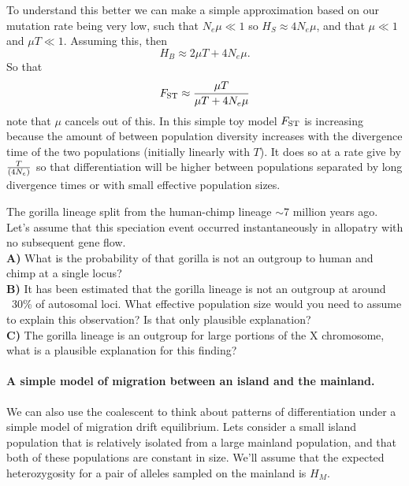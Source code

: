To understand this better we can make a simple
approximation based on our mutation rate being very low, such that
$N_e \mu \ll 1$ so $H_S \approx
4N_e\mu$, and that $\mu \ll 1$ and $\mu T \ll 1$. Assuming this, then  
\begin{equation}
H_B \approx 2 \mu T + 4N_e\mu. 
\end{equation}
So that 
\begin{equation}
\fst \approx \frac{ \mu T}{\mu T +  4N_e\mu }  %
\end{equation}
note that $\mu$ cancels out of this. In this simple toy model $\fst$
is increasing because the amount of between population diversity 
increases with the divergence time of the two populations (initially
linearly with $T$). It does so at a rate
give by $\nicefrac{T}{(4N_e)}$ so that differentiation will be higher
between populations separated by long divergence times or with small
effective population sizes.

\begin{question}
The gorilla lineage split from the human-chimp lineage $\sim$7 million years ago. Let’s assume that this speciation event occurred instantaneously in allopatry with no subsequent gene flow. \\
{\bf A)}	What is the probability of that gorilla is not an outgroup to human and chimp at a single locus?\\
{\bf B)}	It has been estimated that the gorilla lineage is not an outgroup at around ~30\% of autosomal loci. What effective population size would you need to assume to explain this observation? Is that only plausible explanation?\\
{\bf C)}	The gorilla lineage is an outgroup for large portions of the X chromosome, what is a plausible explanation for this finding?
\end{question}

\paragraph{A simple model of migration between an island and the mainland.}
We can also use the coalescent to think about patterns of
differentiation under a simple model of migration drift
equilibrium. Lets consider a small island population that is relatively isolated
from a large mainland population, and that both of these populations
are constant in size. We'll assume that the expected heterozygosity
for a pair of alleles sampled on the mainland is $H_M$.

